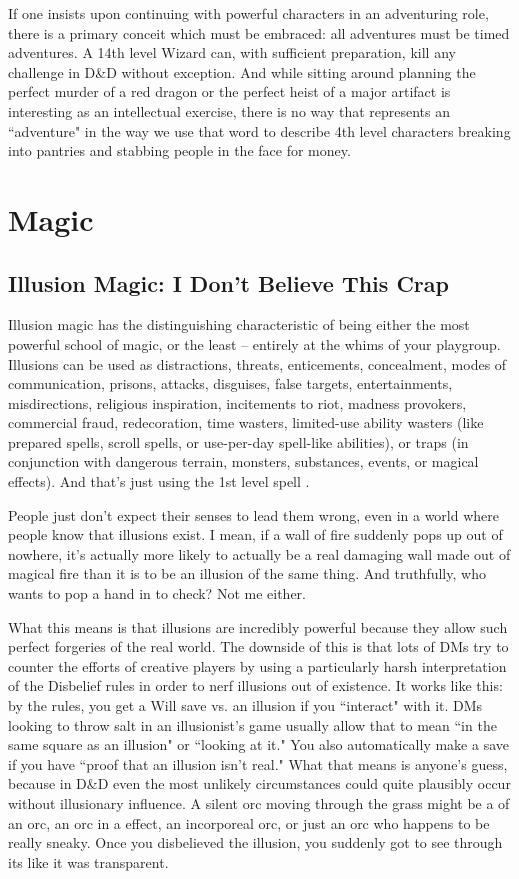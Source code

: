 If one insists upon continuing with powerful characters in an adventuring role, there is a primary conceit which must be embraced: all adventures must be timed adventures. A 14th level Wizard can, with sufficient preparation, kill any challenge in D\&D without exception. And while sitting around planning the perfect murder of a red dragon or the perfect heist of a major artifact is interesting as an intellectual exercise, there is no way that represents an ``adventure" in the way we use that word to describe 4th level characters breaking into pantries and stabbing people in the face for money.


\section{Magic}

\subsection{Illusion Magic: I Don't Believe This Crap}

Illusion magic has the distinguishing characteristic of being either the most powerful school of magic, or the least -- entirely at the whims of your playgroup. Illusions can be used as distractions, threats, enticements, concealment, modes of communication, prisons, attacks, disguises, false targets, entertainments, misdirections, religious inspiration, incitements to riot, madness provokers, commercial fraud, redecoration, time wasters, limited-use ability wasters (like prepared spells, scroll spells, or use-per-day spell-like abilities), or traps (in conjunction with dangerous terrain, monsters, substances, events, or magical effects). And that's just using the 1st level spell .

People just don't expect their senses to lead them wrong, even in a world where people know that illusions exist. I mean, if a wall of fire suddenly pops up out of nowhere, it's actually more likely to actually be a real damaging wall made out of magical fire than it is to be an illusion of the same thing. And truthfully, who wants to pop a hand in to check? Not me either.

What this means is that illusions are incredibly powerful because they allow such perfect forgeries of the real world. The downside of this is that lots of DMs try to counter the efforts of creative players by using a particularly harsh interpretation of the Disbelief rules in order to nerf illusions out of existence. It works like this: by the rules, you get a Will save vs. an illusion if you ``interact" with it. DMs looking to throw salt in an illusionist's game usually allow that to mean ``in the same square as an illusion" or ``looking at it." You also automatically make a save if you have ``proof that an illusion isn't real." What that means is anyone's guess, because in D\&D even the most unlikely circumstances could quite plausibly occur without illusionary influence. A silent orc moving through the grass might be a  of an orc, an orc in a  effect, an incorporeal orc, or just an orc who happens to be really sneaky. Once you disbelieved the illusion, you suddenly got to see through its like it was transparent.

